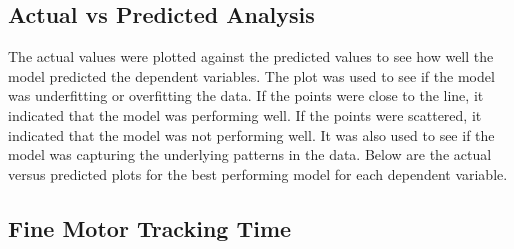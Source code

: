 \subsection{Actual vs Predicted Analysis}
The actual values were plotted against the predicted values to see how well the model predicted the
dependent variables. The plot was used to see if the model was underfitting or overfitting the data. If the points were close to the line, it indicated that the model was performing well.
If the points were scattered, it indicated that the model was not performing well. It was also used to see if the model was capturing the underlying patterns in the data. Below are the
actual versus predicted plots for the best performing model for each dependent variable.

\subsection*{Fine Motor Tracking Time}

